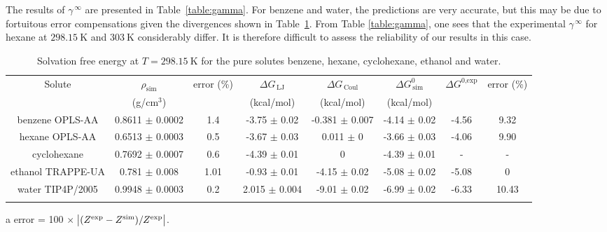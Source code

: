 \documentclass[3p,twocolumn]{elsarticle}
\begin{document}
The results of $\gamma^{\, \infty}$ are presented in Table~\ref{table:gamma}.
For benzene and water, the predictions are very accurate, but this may be due to fortuitous error compensations given the divergences shown in Table~\ref{table:mu_solutes}.
From Table \ref{table:gamma}, one sees that the experimental $\gamma^{\, \infty}$ for hexane at $298.15~\text{K}$ and $303~\text{K}$ considerably differ.
It is therefore difficult to assess the reliability of our results in this case.

\begin{table}
\centering
\begin{adjustbox}{width=1\textwidth}
\begin{threeparttable}
\caption{Solvation free energy at $T = 298.15~\text{K}$ for the pure solutes benzene, hexane, cyclohexane, ethanol and water.}
\begin{tabular}{ c c c c c c c c }
\toprule
Solute & $\rho_\text{sim}$ & error (\%)\tnote{a} & $\Delta G_{\,\text{LJ}}$  & $\Delta G_{\,\text{Coul}}$  & $\Delta G^{0}_{\,\text{sim}}$ & $\Delta G^{\text{0,exp}}$   & error (\%)\tnote{a}\\
 & (g/cm$^{3}$) &  & (kcal/mol) &  (kcal/mol) &  (kcal/mol)   &  \\
\hline
benzene OPLS-AA   & 0.8611 $\pm$ 0.0002 & 1.4 & -3.75  $\pm$ 0.02 & -0.381 $\pm$ 0.007 & -4.14 $\pm$ 0.02 & -4.56 & 9.32  \\
hexane OPLS-AA    & 0.6513 $\pm$ 0.0003 & 0.5 & -3.67  $\pm$  0.03 & 0.011 $\pm$ 0 & -3.66 $\pm$ 0.03 & -4.06 & 9.90 \\
cyclohexane & 0.7692 $\pm$ 0.0007 & 0.6 & -4.39 $\pm$ 0.01 & 0 & -4.39 $\pm$ 0.01 & - & -  \\
ethanol TRAPPE-UA   & 0.781 $\pm$ 0.008 & 1.01  &-0.93 $\pm$ 0.01 & -4.15 $\pm$ 0.02  & -5.08  $\pm$ 0.02  & -5.08 & 0 \\
water TIP4P/2005   &  0.9948 $\pm$ 0.0003 & 0.2 & 2.015 $\pm$ 0.004 & -9.01 $\pm$ 0.02 & -6.99 $\pm$ 0.02 & -6.33  &10.43 \\
 \bottomrule
\label{table:mu_solutes} 
\end{tabular}
\begin{tablenotes}
\item[a] error = 100 $\times$ $\abs{(Z^{\text{exp}} - Z^\text{sim})/Z^{\text{exp}}}$.
\end{tablenotes}
\end{threeparttable}
\end{adjustbox}
\end{table}
\end{document}
